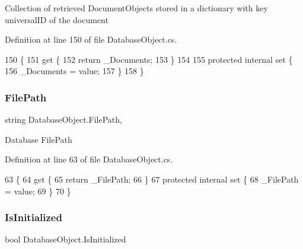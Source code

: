 Collection of retrieved Document\+Objects stored in a dictionary with key universal\+ID of the document 



Definition at line 150 of file Database\+Object.\+cs.


\begin{DoxyCode}
150                                                         \{
151         \textcolor{keyword}{get} \{
152             \textcolor{keywordflow}{return} \_Documents;
153         \}
154 
155         \textcolor{keyword}{protected} \textcolor{keyword}{internal} \textcolor{keyword}{set} \{
156             \_Documents = value;
157         \}
158     \}
\end{DoxyCode}
\mbox{\label{class_database_object_a38a1a78430c6cd1fc4eef054e39145ce}} 
\subsubsection{\texorpdfstring{File\+Path}{FilePath}}
{\footnotesize\ttfamily string Database\+Object.\+File\+Path\hspace{0.3cm}{\ttfamily [get]}, {\ttfamily [set]}}



Database File\+Path 



Definition at line 63 of file Database\+Object.\+cs.


\begin{DoxyCode}
63                            \{
64         \textcolor{keyword}{get} \{
65             \textcolor{keywordflow}{return} \_FilePath;
66         \}
67         \textcolor{keyword}{protected} \textcolor{keyword}{internal} \textcolor{keyword}{set} \{
68             \_FilePath = value;
69         \}
70     \}
\end{DoxyCode}
\mbox{\label{class_database_object_a5fe036d32a30eb10d1b3f6a30263f740}} 
\subsubsection{\texorpdfstring{Is\+Initialized}{IsInitialized}}
{\footnotesize\ttfamily bool Database\+Object.\+Is\+Initialized\hspace{0.3cm}{\ttfamily [get]}}




